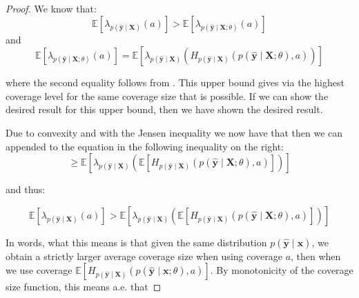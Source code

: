 \begin{proof}
    We know that:
    \begin{equation}
        \mathbb{E}\left[\lambda_{p(\mathbf{\hat{y}}\mid\mathbf{X})}(a)\right] > \mathbb{E}\left[ \lambda_{p(\mathbf{\hat{y}}\mid\mathbf{X};\theta)}( a) \right]
        \label{eq:inequality_0}
    \end{equation}
    and
    \begin{equation}
        \mathbb{E}\left[ \lambda_{p(\mathbf{\hat{y}}\mid\mathbf{X}; \theta)}( a) \right]
        =\mathbb{E}\left[ \lambda_{p(\mathbf{\hat{y}}\mid\mathbf{X})}\left(
            H_{p(\hat{\mathbf{y}}\mid \mathbf{X})}(p(\mathbf{\hat{y}}\mid \mathbf{X}; \theta), a)\right)
            \right]
        \label{eq:inequality_1}
    \end{equation}

    where the second equality follows from . This upper bound gives via  the highest coverage level for the same coverage size that is possible. If we can show the desired result for this upper bound, then we have shown the desired result.

    Due to convexity and with the Jensen inequality we now have that then we can appended to the equation in  the following inequality on the right:
    \begin{equation}
        \geq \mathbb{E}\left[ \lambda_{p(\mathbf{\hat{y}}\mid\mathbf{X})}\left(
            \mathbb{E}\left[H_{p(\hat{\mathbf{y}}\mid \mathbf{X})}(p(\mathbf{\hat{y}}\mid \mathbf{X};
                \theta), a)
                \right] \right)\right]
    \end{equation}

    and thus:

    \begin{equation}
        \mathbb{E}\left[\lambda_{p(\mathbf{\hat{y}}\mid\mathbf{X})}(a)\right]
        > \mathbb{E}\left[ \lambda_{p(\mathbf{\hat{y}}\mid\mathbf{X})}\left(
            \mathbb{E}\left[H_{p(\hat{\mathbf{y}}\mid \mathbf{X})}(p(\mathbf{\hat{y}}\mid \mathbf{X};
                \theta), a)
                \right] \right)\right]
    \end{equation}

    In words, what this means is that given the same distribution $p(\mathbf{\hat{y}}\mid\mathbf{x})$, we obtain a strictly larger average coverage size when using coverage $a$, then when we use coverage $\mathbb{E}\left[H_{p(\hat{\mathbf{y}}\mid \mathbf{X})}(p(\mathbf{\hat{y}}\mid \mathbf{x};\theta), a)\right]$. By monotonicity of the coverage size function, this means a.e. that


\end{proof}
